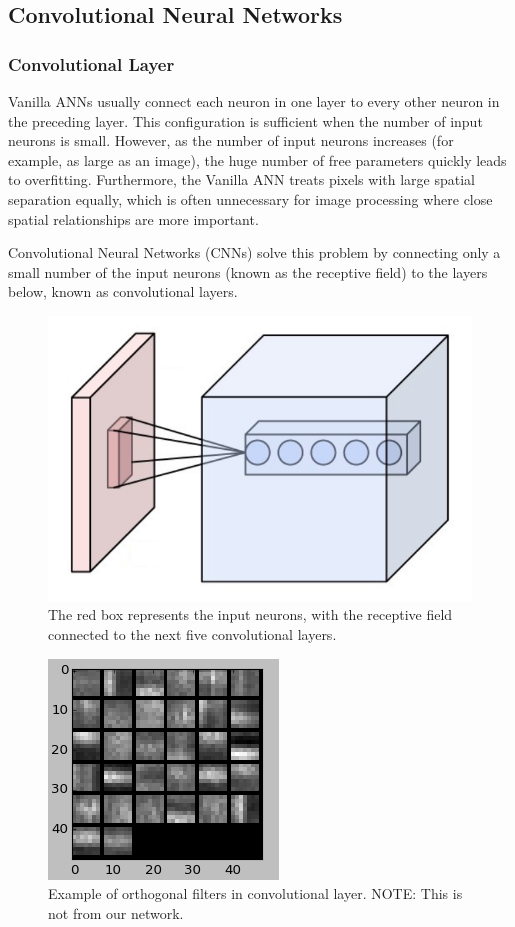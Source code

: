 \documentclass[twoside]{article}
\begin{document}
\begin{multicols}{2}
\subsection{Convolutional Neural Networks}
\subsubsection{Convolutional Layer}
Vanilla ANNs usually connect each neuron in one layer to every other neuron in the preceding layer. This configuration is sufficient when the number of input neurons is small. However, as the number of input neurons increases (for example, as large as an image), the huge number of free parameters quickly leads to overfitting. Furthermore, the Vanilla ANN treats pixels with large spatial separation equally, which is often unnecessary for image processing where close spatial relationships are more important. \par Convolutional Neural Networks (CNNs) solve this problem by connecting only a small number of the input neurons (known as the receptive field) to the layers below, known as convolutional layers.
\begin{figure}[H]
	\centering
	\includegraphics[width=0.5\linewidth]{images/Conv_layer}
	\caption{The red box represents the input neurons, with the receptive field connected to the next five convolutional layers.}
\end{figure}

\begin{figure}[H]    
  \centering
    \includegraphics[width=0.5\linewidth]{images/ortho}
    \caption{Example of orthogonal filters in convolutional layer. NOTE: This is not from our network.}
    \label{ortho}
\end{figure}


\end{multicols}
\end{document}
